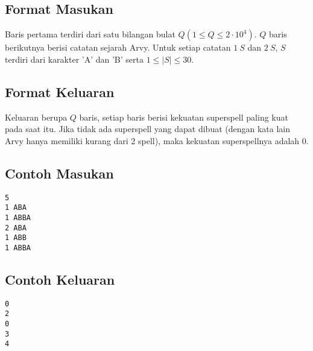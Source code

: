 \documentclass{article}
\begin{document}
\subsection*{Format Masukan}
Baris pertama terdiri dari satu bilangan bulat $Q (1 \leq Q \leq 2\cdot10^4)$. $Q$ baris berikutnya berisi catatan sejarah Arvy. Untuk setiap catatan $1\:S$ dan $2\:S$, $S$ terdiri dari karakter 'A' dan 'B' serta $1 \leq |S| \leq 30$.

\subsection*{Format Keluaran}
Keluaran berupa $Q$ baris, setiap baris berisi kekuatan superspell paling kuat pada saat itu. Jika tidak ada superspell yang dapat dibuat (dengan kata lain Arvy hanya memiliki kurang dari 2 spell), maka kekuatan superspellnya adalah 0.

\begin{multicols}{2}
\subsection*{Contoh Masukan}
\begin{lstlisting}
5
1 ABA
1 ABBA
2 ABA
1 ABB
1 ABBA

\end{lstlisting}
\columnbreak
\subsection*{Contoh Keluaran}
\begin{lstlisting}
0
2
0
3
4
\end{lstlisting}
\vfill
\null
\end{multicols}
\pagebreak
\end{document}
